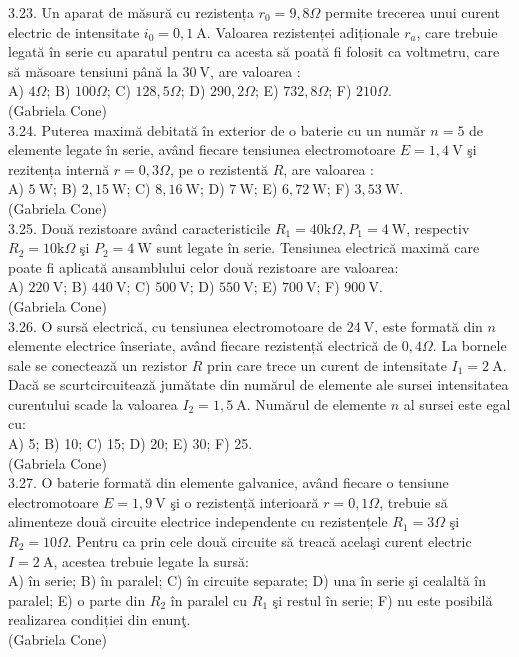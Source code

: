 3.23. Un aparat de măsură cu rezistența $r_{0}=9,8 \Omega$ permite trecerea unui curent electric de intensitate $i_{0}=0,1 \mathrm{~A}$. Valoarea rezistenței adiționale $r_{a}$, care trebuie legată în serie cu aparatul pentru ca acesta să poată fi folosit ca voltmetru, care să măsoare tensiuni până la $30 \mathrm{~V}$, are valoarea :\\ A) $4 \Omega$; B) $100 \Omega$; C) $128,5 \Omega$; D) $290,2 \Omega$; E) $732,8 \Omega$; F) $210 \Omega$.\\ (Gabriela Cone)\\

3.24. Puterea maximă debitată în exterior de o baterie cu un număr $n=5$ de elemente legate în serie, având fiecare tensiunea electromotoare $E=1,4 \mathrm{~V}$ şi rezitența internă $r=0,3 \Omega$, pe o rezistentă $R$, are valoarea :\\ A) $5 \mathrm{~W}$; B) $2,15 \mathrm{~W}$; C) $8,16 \mathrm{~W}$; D) $7 \mathrm{~W}$; E) $6,72 \mathrm{~W}$; F) $3,53 \mathrm{~W}$.\\ (Gabriela Cone)\\

3.25. Două rezistoare având caracteristicile $R_{1}=40 \mathrm{k} \Omega, P_{1}=4 \mathrm{~W}$, respectiv $R_{2}=10 \mathrm{k} \Omega$ şi $P_{2}=4 \mathrm{~W}$ sunt legate în serie. Tensiunea electrică maximă care poate fi aplicată ansamblului celor două rezistoare are valoarea:\\ A) $220 \mathrm{~V}$; B) $440 \mathrm{~V}$; C) $500 \mathrm{~V}$; D) $550 \mathrm{~V}$; E) $700 \mathrm{~V}$; F) $900 \mathrm{~V}$.\\ (Gabriela Cone)\\

3.26. O sursă electrică, cu tensiunea electromotoare de $24 \mathrm{~V}$, este formată din $n$ elemente electrice înseriate, având fiecare rezistență electrică de $0,4 \Omega$. La bornele sale se conectează un rezistor $R$ prin care trece un curent de intensitate $I_{1}=2 \mathrm{~A}$. Dacă se scurtcircuitează jumătate din numărul de elemente ale sursei intensitatea curentului scade la valoarea $I_{2}=1,5 \mathrm{~A}$. Numărul de elemente $n$ al sursei este egal cu:\\ A) 5; B) 10; C) 15; D) 20; E) 30; F) 25.\\ (Gabriela Cone)\\

3.27. O baterie formată din elemente galvanice, având fiecare o tensiune electromotoare $E=1,9 \mathrm{~V}$ şi o rezistență interioară $r=0,1 \Omega$, trebuie să alimenteze două circuite electrice independente cu rezistențele $R_{1}=3 \Omega$ şi $R_{2}=10 \Omega$. Pentru ca prin cele două circuite să treacă acelaşi curent electric $I=2 \mathrm{~A}$, acestea trebuie legate la sursă:\\ A) în serie; B) în paralel; C) în circuite separate; D) una în serie şi cealaltă în paralel; E) o parte din $R_{2}$ în paralel cu $R_{1}$ şi restul în serie; F) nu este posibilă realizarea condiției din enunţ.\\ (Gabriela Cone)\\

